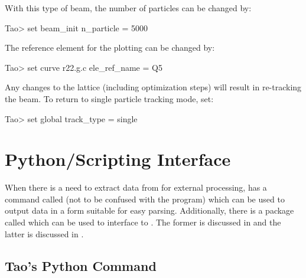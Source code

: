 \documentclass{hitec}     %
\newcommand{\Section}[1]{\section{#1}\vspace*{-1ex}}
\begin{document}
{With this type of beam, the number of particles can be changed by:
\begin{code}
Tao> set beam_init n_particle = 5000
\end{code}

The reference element for the plotting can be changed by:
\begin{code}
Tao> set curve r22.g.c ele_ref_name = Q5
\end{code}

Any changes to the lattice (including optimization steps) will result in re-tracking the beam. To
return to single particle tracking mode, set:
\begin{code}
Tao> set global track_type = single
\end{code}

%

\newpage

\Section{Python/Scripting Interface}
\label{s:python}

When there is a need to extract data from \tao for external processing, \tao has a command called
 (not to be confused with the  program) which can be used to output data in a
form suitable for easy parsing. Additionally, there is a package called  which can be used
to interface \tao to . The former is discussed in  and the latter is
discussed in .

\subsection{Tao's Python Command}
\label{s:python.cmd}

}
\end{document}
